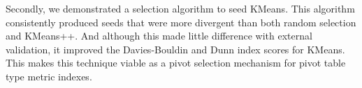 Secondly, we demonstrated a selection algorithm to seed KMeans.  This algorithm consistently produced seeds that were more divergent than both random selection and KMeans++.  And although this made little difference with external validation, it improved the Davies-Bouldin and Dunn index scores for KMeans.  This makes this technique viable as a pivot selection mechanism for pivot table type metric indexes.

%
